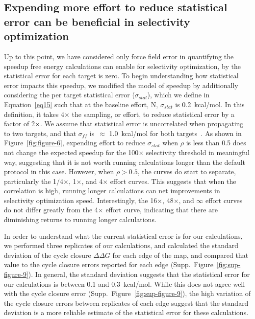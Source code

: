 \documentclass[phd,tocprelim]{cornell}
\begin{document}
\subsection{Expending more effort to reduce statistical error can be beneficial in selectivity optimization}

Up to this point, we have considered only force field error in quantifying the speedup free energy calculations can enable for selectivity optimization, by the statistical error for each target is zero. 
To begin understanding how statistical error impacts this speedup, we modified the model of speedup by additionally considering the per target statistical error ($\sigma_{stat}$), which we define in Equation~\ref{eq15} such that at the baseline effort, N, $\sigma_{stat}$ is 0.2~kcal/mol. In this definition, it takes 4$\times$ the sampling, or effort, to reduce statistical error by a factor of 2$\times$. 
We assume that statistical error is uncorrelated when propagating to two targets, and that $\sigma_{ff}$ is~$\approx$ 1.0~kcal/mol for both targets~\citep{Harder:J.Chem.TheoryComput.:2016, Hauser:2018vz}. As shown in Figure~\ref{fig:figure-6}, expending effort to reduce $\sigma_{stat}$ when $\rho$ is less than 0.5 does not change the expected speedup for the 100$\times$ selectivity threshold in meaningful way, suggesting that it is not worth running calculations longer than the default protocol in this case. However, when $\rho > 0.5$, the curves do start to separate, particularly the 1/4$\times$, 1$\times$, and 4$\times$ effort curves. This suggests that when the correlation is high, running longer calculations can net improvements in selectivity optimization speed. Interestingly, the 16$\times$, 48$\times$, and $\infty$ effort curves do not differ greatly from the 4$\times$ effort curve, indicating that there are diminishing returns to running longer calculations. 

In order to understand what the current statistical error is for our calculations, we performed three replicates of our calculations, and calculated the standard deviation of the cycle closure $\Delta \Delta G$ for each edge of the map, and compared that value to the cycle closure errors reported for each edge (Supp.~Figure~\ref{fig:sup-figure-9}). 
In general, the standard deviation suggests that the statistical error for our calculations is between 0.1 and 0.3~kcal/mol. While this does not agree well with the cycle closure error (Supp.~Figure~\ref{fig:sup-figure-9}), the high variation of the cycle closure errors between replicates of each edge suggest that the standard deviation is a more reliable estimate of the statistical error for these calculations. 
\end{document}
